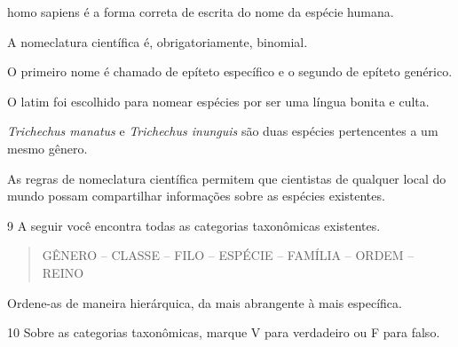 \begin{boxlist}
\item homo sapiens é a forma correta de escrita do nome da espécie humana. 

\item A nomeclatura científica é, obrigatoriamente, binomial. 

\item O primeiro nome é chamado de epíteto específico e o segundo de
epíteto genérico. 

\item O latim foi escolhido para nomear espécies por ser uma língua bonita
e culta. 

\item \emph{Trichechus manatus} e \emph{Trichechus inunguis} são duas
espécies pertencentes a um mesmo gênero. 

\item As regras de nomeclatura científica permitem que cientistas de
qualquer local do mundo possam compartilhar informações sobre as
espécies existentes. 
\end{boxlist}

\num{9}  A seguir você encontra todas as categorias taxonômicas existentes.

\begin{quote}
GÊNERO -- CLASSE -- FILO -- ESPÉCIE -- FAMÍLIA -- ORDEM -- REINO
\end{quote}

Ordene-as de maneira hierárquica, da mais abrangente à mais específica.



\num{10}  Sobre as categorias taxonômicas, marque V para verdadeiro ou F para falso.

